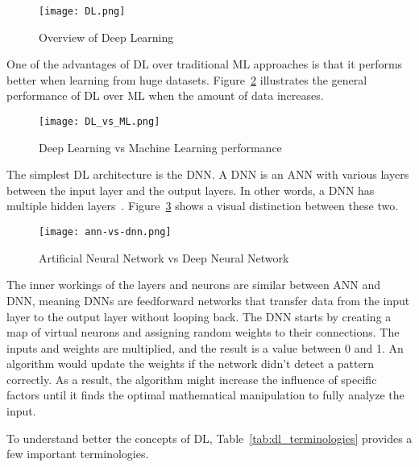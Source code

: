 \begin{figure}[htbp]
    \centering
    \texttt{[image: DL.png]}
    \caption{Overview of Deep Learning~\cite{Alzubaidi2021ReviewDirections}}
    \label{fig:DL}
\end{figure}

One of the advantages of \gls{DL} over traditional \gls{ML} approaches is that it performs better when learning from huge datasets. Figure~\ref{fig:DL_vs_ML} illustrates the general performance of \gls{DL} over \gls{ML} when the amount of data increases.

\begin{figure}[htbp]
    \centering
    \texttt{[image: DL\_vs\_ML.png]}
    \caption{Deep Learning vs Machine Learning performance~\cite{Alom2019AArchitectures}}
    \label{fig:DL_vs_ML}
\end{figure}

The simplest \gls{DL} architecture is the \gls{DNN}. A \gls{DNN} is an \gls{ANN} with various layers between the input layer and the output layers. In other words, a \gls{DNN} has multiple hidden layers~\cite{Schmidhuber2015DeepOverview}. Figure~\ref{fig:ann-vs-dnn} shows a visual distinction between these two.

\begin{figure}[htbp]
    \centering
    \texttt{[image: ann-vs-dnn.png]}
    \caption{Artificial Neural Network vs Deep Neural Network~\cite{Mostafa2020MachineArticle}}
    \label{fig:ann-vs-dnn}
\end{figure}

The inner workings of the layers and neurons are similar between \gls{ANN} and \gls{DNN}, meaning \gls{DNN}s are feedforward networks that transfer data from the input layer to the output layer without looping back. The \gls{DNN} starts by creating a map of virtual neurons and assigning random weights to their connections. The inputs and weights are multiplied, and the result is a value between 0 and 1. An algorithm would update the weights if the network didn't detect a pattern correctly. As a result, the algorithm might increase the influence of specific factors until it finds the optimal mathematical manipulation to fully analyze the input.

To understand better the concepts of \gls{DL}, Table~\ref{tab:dl_terminologies} provides a few important terminologies.


